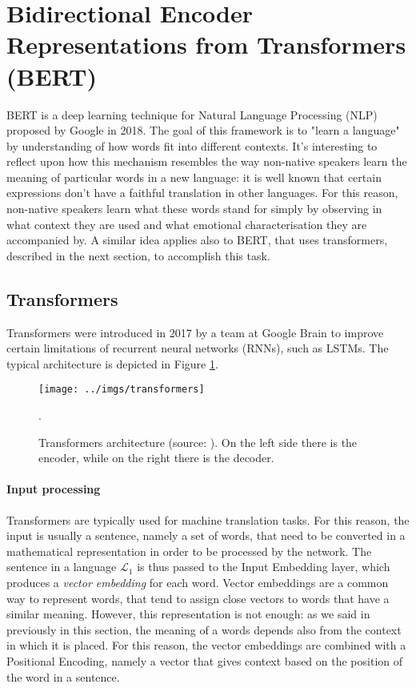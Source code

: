 \documentclass[12pt,a4paper]{book}
\theoremstyle{definition}
\begin{document}
	\section{Bidirectional Encoder Representations from Transformers (BERT)}
	BERT \cite{Devlin2018} is a deep learning technique for Natural Language Processing (NLP) proposed by Google in 2018. The goal of this framework is to "learn a language" by understanding of how words fit into different contexts. It's interesting to reflect upon how this mechanism resembles the way non-native speakers learn the meaning of particular words in a new language: it is well known that certain expressions don't have a faithful translation in other languages. For this reason, non-native speakers learn what these words stand for simply by observing in what context they are used and what emotional characterisation they are accompanied by. A similar idea applies also to BERT, that uses transformers, described in the next section, to accomplish this task.
	
	\subsection{Transformers}
	Transformers \cite{Vaswani2017} were introduced in 2017 by a team at Google Brain to improve certain limitations of recurrent neural networks (RNNs), such as LSTMs. The typical architecture is depicted in Figure \ref{fig:transformer}.
	\begin{figure}[!ht]
		\centering
		\texttt{[image: ../imgs/transformers]}
		\captionsetup{width=.55\linewidth}
		\caption{Transformers architecture (source: \cite{Vaswani2017}). On the left side there is the encoder, while on the right there is the decoder.}
		\label{fig:transformer}.
	\end{figure}
	
	\paragraph{Input processing}
	Transformers are typically used for machine translation tasks. For this reason, the input is usually a sentence, namely a set of words, that need to be converted in a mathematical representation in order to be processed by the network. The sentence in a language $\mathcal{L}_1$ is thus passed to the Input Embedding layer, which produces a \textit{vector embedding} for each word. Vector embeddings are a common way to represent words, that tend to assign close vectors to words that have a similar meaning. However, this representation is not enough: as we said in previously in this section, the meaning of a words depends also from the context in which it is placed. For this reason, the vector embeddings are combined with a Positional Encoding, namely a vector that gives context based on the position of the word in a sentence. 
	
\end{document}

